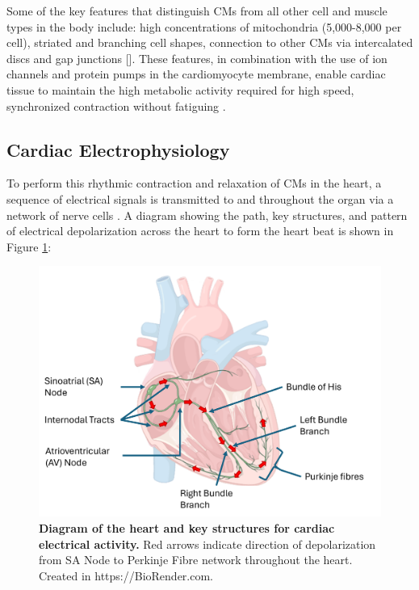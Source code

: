 Some of the key features that distinguish CMs from all other cell and muscle types in the body include: high concentrations of mitochondria (5,000-8,000 per cell), striated and branching cell shapes, connection to other CMs via intercalated discs and gap junctions []. These features, in combination with the use of ion channels and protein pumps in the cardiomyocyte membrane, enable cardiac tissue to maintain the high metabolic activity required for high speed, synchronized contraction without fatiguing \cite{woodcock_cardiomyocytes_2005}. 



\subsection{Cardiac Electrophysiology}
To perform this rhythmic contraction and relaxation of CMs in the heart, a sequence of electrical signals is transmitted to and throughout the organ via a network of nerve cells \cite{saltzman_biomedical_2015}. A diagram showing the path, key structures, and pattern of electrical depolarization across the heart to form the heart beat is shown in Figure \ref{fig:HeartElec}:

\begin{figure}[H]
    \centering
    \includegraphics[width=0.85\linewidth]{Figures/Figure1.2.png}
    \caption{\textbf{Diagram of the heart and key structures for cardiac electrical activity.} Red arrows indicate direction of depolarization from SA Node to Perkinje Fibre network throughout the heart. Created in  https://BioRender.com. }
    \label{fig:HeartElec}
\end{figure}

